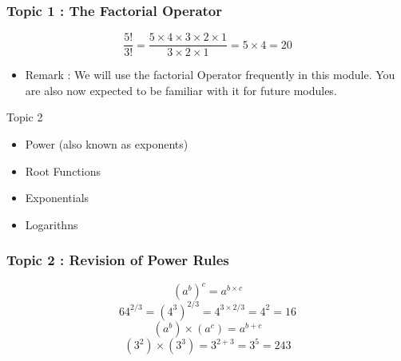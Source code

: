 \documentclass{beamer}
\begin{document}
\begin{frame}
	\frametitle{Topic 1 : The Factorial Operator}	
	\[ \frac{5!}{3!} = \frac{5 \times 4 \times 3 \times 2 \times 1}{ 3 \times 2 \times 1 }  = 5 \times 4 = 20 \]
	
	\begin{itemize}
		\item Remark :  We will use the factorial Operator frequently in this module. You are also now expected to be familiar with it for future modules.
	\end{itemize}
\end{frame}
\begin{frame}
	\large
	Topic 2
	\begin{itemize}
	\item Power (also known as exponents)
	\item Root Functions
	\item Exponentials
	\item Logarithns
\end{itemize}
\end{frame}
\begin{frame}
	\frametitle{Topic 2 : Revision of Power Rules}
	\LARGE
	\[ (a^b)^c = a^{b \times c}\] \bigskip
	\[ 64^{2/3} =  (4^3)^{2/3} = 4^{3\times2/3} = 4^2 = 16 \] \bigskip
	\[ (a^b) \times (a^c) = a^{b+c}\] \bigskip
	\[ (3^2) \times (3^3) = 3^{2+3} = 3^5  =243 \]
\end{frame}
\end{document}
